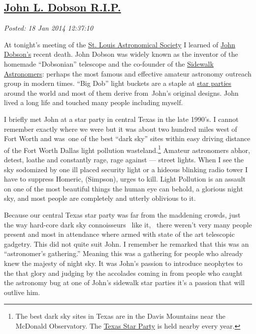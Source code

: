 %

\subsection*{\href{https://bakerjd99.wordpress.com/2014/01/18/john-l-dobson-r-i-p/}{John L. Dobson R.I.P.}}


\noindent\emph{Posted: 18 Jan 2014 12:37:10}
\vspace{6pt}

At tonight's meeting of the \href{http://www.slasonline.org/}{St. Louis
Astronomical Society} I learned of
\href{http://www.universetoday.com/108150/john-dobson-inventor-of-the-popular-dobsonian-telescope-dead-at-98/}{John
Dobson's} recent death. John Dobson was widely known as the inventor of
the homemade ``Dobsonian'' telescope and the co-founder of the
\href{http://www.sidewalkastronomers.us/}{Sidewalk Astronomers}: perhaps
the most famous and effective amateur astronomy outreach group in modern
times. ``Big Dob'' light buckets are a staple at
\href{http://stardate.org/nightsky/star\_parties}{star parties} around
the world and most of them derive from~John's original designs. John
lived a long life and touched many people including myself.

I briefly met John at a star party in central Texas in the late 1990's.
I cannot remember exactly where we were but it was about two hundred
miles west of Fort Worth and was~one of the best ``dark sky'' sites
within easy driving distance of the Fort Worth Dallas light pollution
wasteland.\footnote{
The best dark sky sites in
Texas are in the Davis Mountains near the McDonald Observatory. The
\href{http://texasstarparty.org/}{Texas Star Party} is held nearby every year.
} Amateur astronomers
abhor, detest, loathe and constantly rage, rage against --- street
lights. When I see the sky sodomized by one ill placed security light or
a hideous blinking radio tower I have to suppress Homeric, (Simpson),
urges to kill. Light Pollution is an assault on one of the most
beautiful things the human eye can behold, a glorious night sky, and
most people are completely and utterly oblivious to it.

Because our central Texas star party was far from the maddening crowds,
just the way hard-core dark sky connoisseurs ~like it, ~there weren't
very many people present and most in attendance where armed with state
of the art telescopic gadgetry. This did not quite suit John. I remember
he remarked that this was an ``astronomer's gathering.'' Meaning this
was a gathering for people who already knew the majesty of night sky. It
was John's passion to introduce neophytes to the that glory and judging
by the accolades coming in from people who caught the astronomy bug at
one of John's sidewalk star parties it's a passion that will outlive
him.

